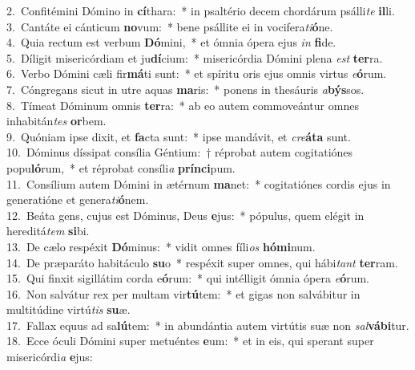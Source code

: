 {2.~}Confitémini Dómino in \textbf{cí}thara:~* in psaltério decem chordárum psálli\textit{te} \textbf{il}li.\\
{3.~}Cantáte ei cánticum \textbf{no}vum:~* bene psállite ei in vocifera\textit{ti}\textbf{ó}ne.\\
{4.~}Quia rectum est verbum \textbf{Dó}mini,~* et ómnia ópera ejus \textit{in} \textbf{fi}de.\\
{5.~}Díligit misericórdiam et ju\textbf{dí}cium:~* misericórdia Dómini plena \textit{est} \textbf{ter}ra.\\
{6.~}Verbo Dómini cæli fir\textbf{má}ti sunt:~* et spíritu oris ejus omnis virtus \textit{e}\textbf{ó}rum.\\
{7.~}Cóngregans sicut in utre aquas \textbf{ma}ris:~* ponens in thesáuris \textit{a}\textbf{býs}sos.\\
{8.~}Tímeat Dóminum omnis \textbf{ter}ra:~* ab eo autem commoveántur omnes inhabitán\textit{tes} \textbf{or}bem.\\
{9.~}Quóniam ipse dixit, et \textbf{fa}cta sunt:~* ipse mandávit, et \textit{cre}\textbf{á}\textbf{ta} sunt.\\
{10.~}Dóminus díssipat consília Géntium:~† réprobat autem cogitatiónes popu\textbf{ló}rum,~* et réprobat consíli\textit{a} \textbf{prín}\textbf{ci}pum.\\
{11.~}Consílium autem Dómini in ætérnum \textbf{ma}net:~* cogitatiónes cordis ejus in generatióne et genera\textit{ti}\textbf{ó}nem.\\
{12.~}Beáta gens, cujus est Dóminus, Deus \textbf{e}jus:~* pópulus, quem elégit in hereditá\textit{tem} \textbf{si}bi.\\
{13.~}De cælo respéxit \textbf{Dó}minus:~* vidit omnes fíli\textit{os} \textbf{hó}\textbf{mi}num.\\
{14.~}De præparáto habitáculo \textbf{su}o~* respéxit super omnes, qui hábi\textit{tant} \textbf{ter}ram.\\
{15.~}Qui finxit sigillátim corda e\textbf{ó}rum:~* qui intélligit ómnia ópera \textit{e}\textbf{ó}rum.\\
{16.~}Non salvátur rex per multam vir\textbf{tú}tem:~* et gigas non salvábitur in multitúdine virtú\textit{tis} \textbf{su}æ.\\
{17.~}Fallax equus ad sa\textbf{lú}tem:~* in abundántia autem virtútis suæ non \textit{sal}\textbf{vá}\textbf{bi}tur.\\
{18.~}Ecce óculi Dómini super metuéntes \textbf{e}um:~* et in eis, qui sperant super misericórdi\textit{a} \textbf{e}jus:\\
